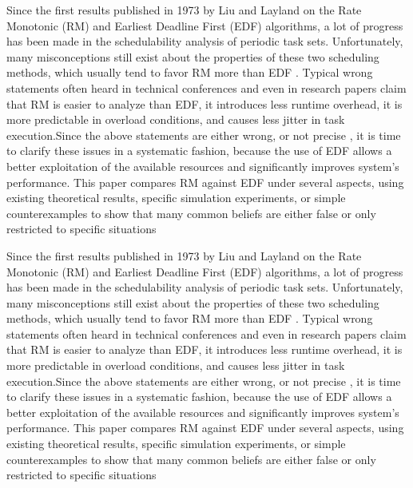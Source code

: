 	\begin{frame}{\subsecname}
\tiny Since the first results published in 1973 by Liu and Layland on the Rate Monotonic (RM) and Earliest Deadline First (EDF) algorithms, a lot of progress has been made in the schedulability analysis of periodic task sets. Unfortunately, many \Large misconceptions \tiny still exist about the properties of these two scheduling methods, which usually tend to \Large favor RM more than EDF \tiny. Typical wrong statements often heard in technical conferences and even in research papers claim that RM is easier to analyze than EDF, it introduces less runtime overhead, it is more predictable in overload conditions, and causes less jitter in task execution.Since the above statements are \Large  either wrong, or not precise \tiny, it is time to clarify these issues in a systematic fashion, because the use of EDF allows a better exploitation of the available resources and significantly improves system’s performance. This paper compares RM against EDF under several aspects, using existing theoretical results, specific simulation experiments, or simple counterexamples to show that many common beliefs are either false or only restricted to specific situations
\end{frame}
	
\begin{frame}{\subsecname}
\tiny Since the first results published in 1973 by Liu and Layland on the Rate Monotonic (RM) and Earliest Deadline First (EDF) algorithms, a lot of progress has been made in the schedulability analysis of periodic task sets. Unfortunately, many \Large misconceptions \tiny still exist about the properties of these two scheduling methods, which usually tend to \Large favor RM more than EDF \tiny. Typical wrong statements often heard in technical conferences and even in research papers claim that RM is easier to analyze than EDF, it introduces less runtime overhead, it is more predictable in overload conditions, and causes less jitter in task execution.Since the above statements are \Large  either wrong, or not precise \tiny, it is time to clarify these issues in a systematic fashion, because the use of EDF allows a better exploitation of the available resources and significantly improves system’s performance. \Large This paper compares RM against EDF \tiny under several aspects, using existing theoretical results, specific simulation experiments, or simple counterexamples to show that many common beliefs are either false or only restricted to specific situations
\end{frame}

